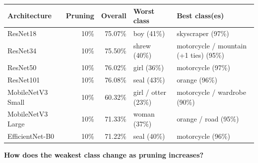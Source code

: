 \begin{center}\small
\begin{tabularx}{\linewidth}{@{}lrrXX@{}}\toprule
Architecture & Pruning & Overall & Worst class & Best class(es) \\ \midrule
ResNet18 & 10\% & 75.07\% & boy (41\%) & skyscraper (97\%) \\
ResNet34 & 10\% & 75.50\% & shrew (40\%) & motorcycle / mountain (+1 ties) (95\%) \\
ResNet50 & 10\% & 76.02\% & girl (36\%) & motorcycle (97\%) \\
ResNet101 & 10\% & 76.08\% & seal (43\%) & orange (96\%) \\
MobileNetV3 Small & 10\% & 60.32\% & girl / otter (23\%) & motorcycle / wardrobe (90\%) \\
MobileNetV3 Large & 10\% & 71.33\% & woman (37\%) & orange / road (95\%) \\
EfficientNet-B0 & 10\% & 71.22\% & seal (40\%) & motorcycle (96\%) \\
\bottomrule\end{tabularx}
\end{center}
\textbf{How does the weakest class change as pruning increases?}
